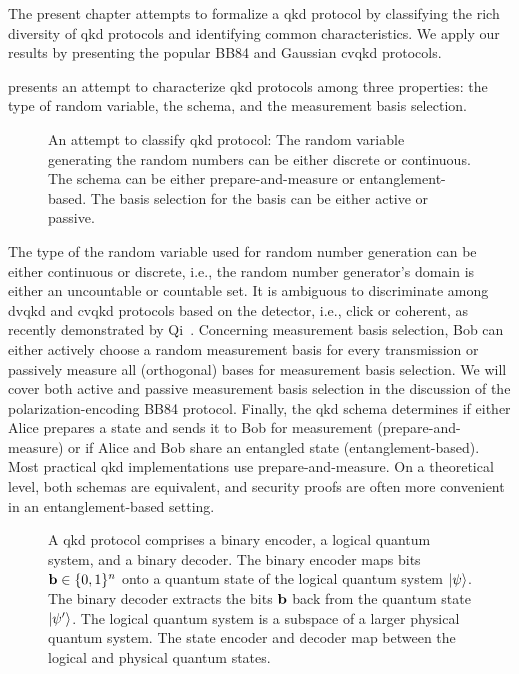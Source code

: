 The present chapter attempts to formalize a \gls{qkd} protocol by classifying the rich diversity of \gls{qkd} protocols and identifying common characteristics.
We apply our results by presenting the popular BB84 and Gaussian \gls{cvqkd} protocols.

 presents an attempt to characterize \gls{qkd} protocols among three properties:
the type of random variable, the schema, and the measurement basis selection.
\begin{figure}[htb]
	\centering
	
	\caption{An attempt to classify \gls{qkd} protocol: The random variable generating the random numbers can be either discrete or continuous. The schema can be either prepare-and-measure or entanglement-based. The basis selection for the basis can be either active or passive.}\label{fig:qkd_classification}
\end{figure}
The type of the random variable used for random number generation can be either continuous or discrete, i.e., the random number generator's domain is either an uncountable or countable set.
It is ambiguous to discriminate among \gls{dvqkd} and \gls{cvqkd} protocols based on the detector, i.e., click or coherent, as recently demonstrated by Qi~\cite{Qi2021}.
Concerning measurement basis selection, Bob can either actively choose a random measurement basis for every transmission or passively measure all (orthogonal) bases for measurement basis selection.
We will cover both active and passive measurement basis selection in the discussion of the polarization-encoding BB84 protocol.
Finally, the \gls{qkd} schema determines if either Alice prepares a state and sends it to Bob for measurement (prepare-and-measure) or if Alice and Bob share an entangled state (entanglement-based).
Most practical \gls{qkd} implementations use prepare-and-measure.
On a theoretical level, both schemas are equivalent, and security proofs are often more convenient in an entanglement-based setting.

\begin{figure}[htb]
	\centering
	
	\caption{A \gls{qkd} protocol comprises a binary encoder, a logical quantum system, and a binary decoder. The binary encoder maps bits $\vb{b}\in\{0,1\}^n$ onto a quantum state of the logical quantum system $\ket{\psi}$. The binary decoder extracts the bits $\vb{b}$ back from the quantum state $\ket{\psi^\prime}$. The logical quantum system is a subspace of a larger physical quantum system. The state encoder and decoder map between the logical and physical quantum states.}
\end{figure}


